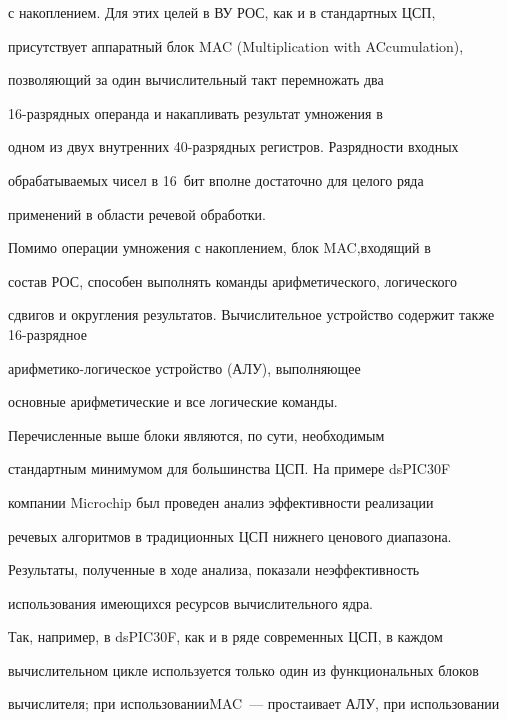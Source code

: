 с накоплением. Для этих целей в ВУ РОС, как и в стандартных ЦСП, 


присутствует аппаратный блок MAC (Multiplication with ACcumulation), 


позволяющий за один вычислительный такт перемножать два 


      16-раз\-ряд\-ных операнда и накапливать результат умножения в 


одном из двух внутренних 40-раз\-ряд\-ных регистров. Разрядности входных 


обрабатываемых чисел в 16~бит вполне достаточно для целого ряда 


применений в области речевой обработки.


      


      Помимо операции умножения с накоплением, блок MAC,\linebreak входящий в 


состав РОС, способен выполнять команды арифметического, логического 


сдвигов и округления результатов. Вычислительное устройство содержит также 16-раз\-ряд\-ное 


      ариф\-ме\-ти\-ко-ло\-ги\-че\-ское устройство (АЛУ), выполняющее 


основные арифметические и все логические команды. 


      


      Перечисленные выше блоки являются, по сути, необходимым 


стандартным минимумом для большинства ЦСП. На примере dsPIC30F 


компании Microchip был проведен анализ эффективности реализации 


речевых алгоритмов в традиционных ЦСП нижнего ценового диапазона. 


Результаты, полученные в ходе анализа, показали неэффективность 


использования имеющихся ресурсов вычислительного ядра.


      


      Так, например, в dsPIC30F, как и в ряде современных ЦСП, в каждом 


вычислительном цикле используется только один из функциональных блоков 


вычислителя; при использовании\linebreak MAC~--- простаивает АЛУ, при использовании 


